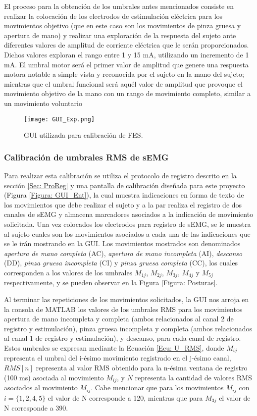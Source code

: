 El proceso para la obtención de los umbrales antes mencionados consiste en realizar la colocación de los electrodos de estimulación eléctrica para los movimientos objetivo (que en este caso son los movimientos de pinza gruesa y apertura de mano) y realizar una exploración de la respuesta del sujeto ante diferentes valores de amplitud de corriente eléctrica que le serán proporcionados. Dichos valores exploran el rango entre 1 y 15 mA, utilizando un incremento de 1 mA. El umbral motor será el primer valor de amplitud que genere una respuesta motora notable a simple vista y reconocida por el sujeto en la mano del sujeto; mientras que el umbral funcional será aquél valor de amplitud que provoque el movimiento objetivo de la mano con un rango de movimiento completo, similar a un movimiento voluntario

\begin{figure}[htb]
	\centering
	\texttt{[image: GUI\_Exp.png]}
	\caption{GUI utilizada para calibración de FES.}
	\label{Figura: GUI_Exp}
\end{figure}

\subsubsection{Calibración de umbrales RMS de sEMG}\label{Sec:CalRMS}
Para realizar esta calibración se utiliza el protocolo de registro descrito en la sección \ref{Sec: ProReg} y una pantalla de calibración diseñada para este proyecto (Figura \ref{Figura: GUI_Ent}), la cual muestra indicaciones en forma de texto de los movimientos que debe realizar el sujeto y a la par realiza el registro de dos canales de sEMG y almacena marcadores asociados a la indicación de movimiento solicitada. Una vez colocados los electrodos para registro de sEMG, se le muestra al sujeto cuales son los movimientos asociados a cada una de las indicaciones que se le irán mostrando en la GUI. Los movimientos mostrados son denominados \emph{apertura de mano completa} (AC), \emph{apertura de mano incompleta} (AI), \emph{descanso} (DD), \emph{pinza gruesa incompleta} (CI) y \emph{pinza gruesa completa} (CC), los cuales corresponden a los valores de los umbrales $M_{1j}$, $M_{2j}$, $M_{3j}$, $M_{4j}$ y $M_{5j}$ respectivamente, y se pueden observar en la Figura \ref{Figura: Posturas}.

Al terminar las repeticiones de los movimientos solicitados, la GUI nos arroja en la consola de MATLAB\textregistered \; los valores de los umbrales RMS para los movimientos apertura de mano incompleta y completa (ambos relacionados al canal 2 de registro y estimulación), pinza gruesa incompleta y completa (ambos relacionados al canal 1 de registro y estimulación), y descanso, para cada canal de registro. Estos umbrales se expresan mediante la Ecuación \ref{Ecu: U_RMS}, donde $M_{ij}$ representa el umbral del i-ésimo movimiento registrado en el j-ésimo canal, $RMS[n]$ representa al valor RMS obtenido para la n-ésima ventana de registro (100 ms) asociada al movimiento $M_{ij}$, y $N$ representa la cantidad de valores RMS asociados al movimiento $M_{ij}$. Cabe mencionar que para los movimientos $M_{ij}$ con $i=\{1,2,4,5\}$ el valor de N corresponde a 120, mientras que para $M_{3j}$ el valor de N corresponde a 390.

